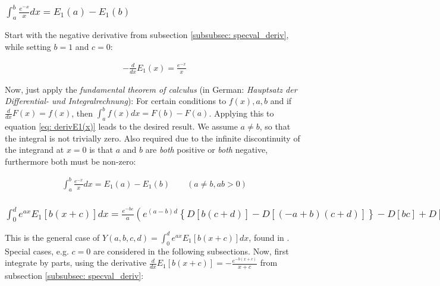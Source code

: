 \documentclass[bibliography=totocnumbered]{scrartcl}
\begin{document}
	\subsubsection[A definite integral having two exponential integrals as result]{$\int_{a}^{b}\frac{e^{-x}}{x}dx=E_1\left(a\right)-E_1\left(b\right)$}
	\label{subsubsec: definiteIntegral}

	Start with the negative derivative from subsection \ref{subsubsec: specval_deriv}, while setting $b=1$ and $c=0$:

	\begin{gather}
		-\frac{d}{dx}E_1\left(x\right)=\frac{e^{-x}}{x}\label{eq: derivE1(x)}
	\end{gather}

	Now, just apply the \emph{fundamental theorem of calculus} (in German: \emph{Hauptsatz der Differential- und Integralrechnung}): For certain conditions to $f\left(x\right), a, b$ and if $\frac{d}{dx}F\left(x\right)=f\left(x\right)$, then $\int_{a}^{b}f\left(x\right)dx=F\left(b\right)-F\left(a\right)$. Applying this to equation \eqref{eq: derivE1(x)} leads to the desired result. We assume $a\neq{}b$, so that the integral is not trivially zero. Also required due to the infinite discontinuity of the integrand at $x=0$ is that $a$ and $b$ are \emph{both} positive or \emph{both} negative, furthermore both must be non-zero:

	\begin{gather}
		\int_{a}^{b}\frac{e^{-x}}{x}dx=E_1\left(a\right)-E_1\left(b\right)\qquad\left(a\neq{}b, ab>0\right)
	\end{gather}

	\subsubsection[A integral of E1(x), involving the exponential function]{$\int_{0}^{d}e^{ax}E_1\left[b\left(x+c\right)\right]dx=\frac{e^{-bc}}{a}\left(e^{\left(a-b\right)d}\left\{D\left[b\left(c+d\right)\right]-D\left[\left(-a+b\right)\left(c+d\right)\right]\right\}-D\left[bc\right]+D\left[\left(-a+b\right)c\right]\right)$}
	\label{subsubsec: generalIntegralOfE1}

	This is the general case of $Y\left(a, b, c, d\right)=\int_{0}^{d}e^{ax}E_1\left[b\left(x+c\right)\right]dx$, found in \cite{boer1990calc}. Special cases, e.g. $c=0$ are considered in the following subsections. Now, first integrate by parts, using the derivative $\frac{d}{dx}E_1\left[b\left(x+c\right)\right]=-\frac{e^{-b\left(x+c\right)}}{x+c}$ from subsection \ref{subsubsec: specval_deriv}:
\end{document}
